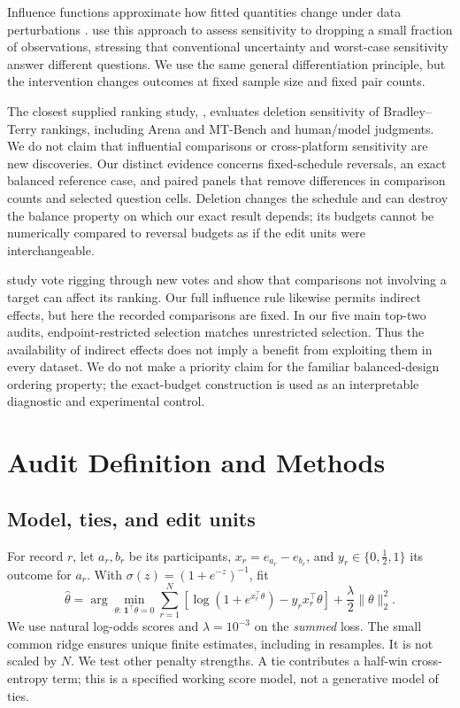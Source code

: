 \documentclass{article}
\newcommand{\sig}{\sigma}
\newcommand{\ind}{\mathbf 1}
\begin{document}
Influence functions approximate how fitted quantities change under data perturbations \citep{koh2017}. \citet{broderick2020} use this approach to assess sensitivity to dropping a small fraction of observations, stressing that conventional uncertainty and worst-case sensitivity answer different questions. We use the same general differentiation principle, but the intervention changes outcomes at fixed sample size and fixed pair counts.

The closest supplied ranking study, \citet{huang2025}, evaluates deletion sensitivity of Bradley--Terry rankings, including Arena and MT-Bench and human/model judgments. We do not claim that influential comparisons or cross-platform sensitivity are new discoveries. Our distinct evidence concerns fixed-schedule reversals, an exact balanced reference case, and paired panels that remove differences in comparison counts and selected question cells. Deletion changes the schedule and can destroy the balance property on which our exact result depends; its budgets cannot be numerically compared to reversal budgets as if the edit units were interchangeable.

\citet{min2025} study vote rigging through new votes and show that comparisons not involving a target can affect its ranking. Our full influence rule likewise permits indirect effects, but here the recorded comparisons are fixed. In our five main top-two audits, endpoint-restricted selection matches unrestricted selection. Thus the availability of indirect effects does not imply a benefit from exploiting them in every dataset. We do not make a priority claim for the familiar balanced-design ordering property; the exact-budget construction is used as an interpretable diagnostic and experimental control.

\section{Audit Definition and Methods}
\subsection{Model, ties, and edit units}
For record $r$, let $a_r,b_r$ be its participants, $x_r=e_{a_r}-e_{b_r}$, and $y_r\in\{0,\tfrac12,1\}$ its outcome for $a_r$. With $\sig(z)=(1+e^{-z})^{-1}$, fit
\begin{equation}\label{eq:loss}
 \hat\theta=\arg\min_{\theta:\,\ind^\top\theta=0}
 \sum_{r=1}^N\left[\log(1+e^{x_r^\top\theta})-y_rx_r^\top\theta\right]
 +\frac{\lambda}{2}\|\theta\|_2^2.
\end{equation}
We use natural log-odds scores and $\lambda=10^{-3}$ on the \emph{summed} loss. The small common ridge ensures unique finite estimates, including in resamples. It is not scaled by $N$. We test other penalty strengths. A tie contributes a half-win cross-entropy term; this is a specified working score model, not a generative model of ties.
\end{document}

